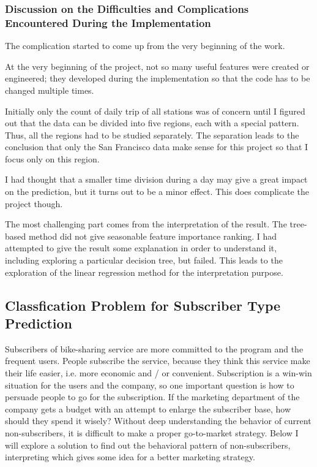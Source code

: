 \documentclass[a4paper]{article}
\begin{document}
			\subsubsection{Discussion on the Difficulties and Complications Encountered During the Implementation}

			The complication started to come up from the very beginning of the work. 
			
			At the very beginning of the project, not so many useful features were created or engineered; they developed during the implementation so that the code has to be changed multiple times. 
			
			Initially only the count of daily trip of all stations was of concern until I figured out that the data can be divided into five regions, each with a special pattern. Thus, all the regions had to be studied separately. The separation leads to the conclusion that only the San Francisco data make sense for this project so that I focus only on this region.
			
			I had thought that a smaller time division during a day may give a great impact on the prediction, but it turns out to be a minor effect. This does complicate the project though.
			
			The most challenging part comes from the interpretation of the result. The tree-based method did not give seasonable feature importance ranking. I had attempted to give the result some explanation in order to understand it, including exploring a particular decision tree, but failed. This leads to the exploration of the linear regression method for the interpretation purpose. 			
					
		\subsection{Classfication Problem for Subscriber Type Prediction}
		Subscribers of bike-sharing service are more committed to the program and the frequent users. People subscribe the service, because they think this service make their life easier, i.e. more economic and / or convenient. Subscription is a win-win situation for the users and the company, so one important question is how to persuade people to go for the subscription. If the marketing department of the company gets a budget with an attempt to enlarge the subscriber base, how should they spend it wisely? Without deep understanding the behavior of current non-subscribers, it is difficult to make a proper go-to-market strategy. Below I will explore a solution to find out the behavioral pattern of non-subscribers, interpreting which gives some idea for a better marketing strategy. 
		
\end{document}
